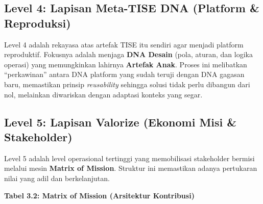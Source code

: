 \documentclass[
  letterpaper,
  DIV=11,
  numbers=noendperiod]{scrreprt}
\begin{document}
\subsection{Level 4: Lapisan Meta-TISE DNA (Platform \&
Reproduksi)}\label{level-4-lapisan-meta-tise-dna-platform-reproduksi}

Level 4 adalah rekayasa atas artefak TISE itu sendiri agar menjadi
platform reproduktif. Fokusnya adalah menjaga \textbf{DNA Desain} (pola,
aturan, dan logika operasi) yang memungkinkan lahirnya \textbf{Artefak
Anak}. Proses ini melibatkan ``perkawinan'' antara DNA platform yang
sudah teruji dengan DNA gagasan baru, memastikan prinsip
\emph{reusability} sehingga solusi tidak perlu dibangun dari nol,
melainkan diwariskan dengan adaptasi konteks yang segar.

\subsection{Level 5: Lapisan Valorize (Ekonomi Misi \&
Stakeholder)}\label{level-5-lapisan-valorize-ekonomi-misi-stakeholder}

Level 5 adalah level operasional tertinggi yang memobilisasi stakeholder
bermisi melalui mesin \textbf{Matrix of Mission}. Struktur ini
memastikan adanya pertukaran nilai yang adil dan berkelanjutan.

\textbf{Tabel 3.2: Matrix of Mission (Arsitektur Kontribusi)}
\end{document}

